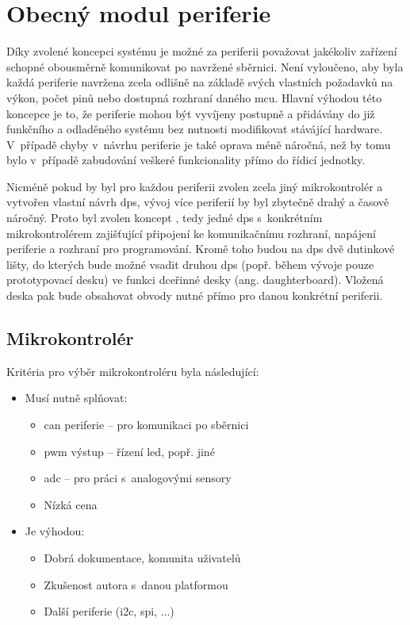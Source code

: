 \chapter{Obecný modul periferie}
\label{sec:modul-periferie}
    Díky zvolené koncepci systému je možné za periferii považovat jakékoliv zařízení schopné obousměrně komunikovat po navržené sběrnici. Není vyloučeno, aby byla každá periferie navržena zcela odlišně na základě svých vlastních požadavků na výkon, počet pinů nebo dostupná rozhraní daného \acs{mcu}. Hlavní výhodou této koncepce je to, že periferie mohou být vyvíjeny postupně a přidávány do již funkčního a odladěného systému bez nutnosti modifikovat stávájící hardware. V~případě chyby v~návrhu periferie je také oprava méně náročná, než by tomu bylo v~případě zabudování veškeré funkcionality přímo do řídicí jednotky. 

    Nicméně pokud by byl pro každou periferii zvolen zcela jiný mikrokontrolér a vytvořen vlastní návrh \acs{dps}, vývoj více periferií by byl zbytečně drahý a časově náročný. Proto byl zvolen koncept , tedy jedné \acs{dps} s~konkrétním mikrokontrolérem zajišťující připojení ke komunikačnímu rozhraní, napájení periferie a rozhraní pro programování. Kromě toho budou na \acs{dps} dvě dutinkové lišty, do kterých bude možné vsadit druhou \acs{dps} (popř. během vývoje pouze prototypovací desku) ve funkci dceřinné desky (ang. daughterboard). Vložená deska pak bude obsahovat obvody nutné přímo pro danou konkrétní periferii.
    
    \section{Mikrokontrolér}

        Kritéria pro výběr mikrokontroléru byla následující:
        \begin{itemize}
            \item Musí nutně splňovat:
            \begin{itemize}
                \item \acs{can} periferie -- pro komunikaci po sběrnici 
                \item \acs{pwm} výstup -- řízení \acs{led}, popř. jiné
                \item \acs{adc} -- pro práci s~analogovými sensory
                \item Nízká cena 
            \end{itemize}
            \item Je výhodou:
            \begin{itemize}
                \item Dobrá dokumentace, komunita uživatelů
                \item Zkušenost autora s~danou platformou
                \item Další periferie (\acs{i2c}, \acs{spi}, ...)
            \end{itemize}
        \end{itemize}

